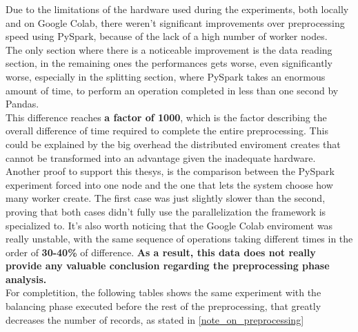 \documentclass[
	letterpaper, %
	10pt, %
]{class}
\begin{document}
Due to the limitations of the hardware used during the experiments, both locally and on Google Colab, there weren't significant improvements over preprocessing speed using PySpark, because of the lack of a high number of worker nodes.\\

The only section where there is a noticeable improvement is the data reading section, in the remaining ones the performances gets worse, even significantly worse, especially in the splitting section, where PySpark takes an enormous amount of time, to perform
an operation completed in less than one second by Pandas.\\

This difference reaches \textbf{a factor of 1000}, which is the factor describing the overall difference of time required to complete the entire preprocessing.
This could be explained by the big overhead the distributed enviroment creates that cannot be transformed into an advantage given the inadequate hardware.\\

Another proof to support this thesys, is the comparison between the PySpark experiment forced into one node and the one that lets the system choose how many worker create.
The first case was just slightly slower than the second, proving that both cases didn't fully use the parallelization the framework is specialized to.
It's also worth noticing that the Google Colab enviroment was really unstable, with the same sequence of operations taking different times in the order of \textbf{30-40\%} of difference.
\textbf{As a result, this data does not really provide any valuable conclusion regarding the preprocessing phase analysis.}\\

For completition, the following tables shows the same experiment with the balancing phase executed before the rest of the preprocessing, that greatly decreases the number of records, as stated in \ref{note_on_preprocessing}
\end{document}
